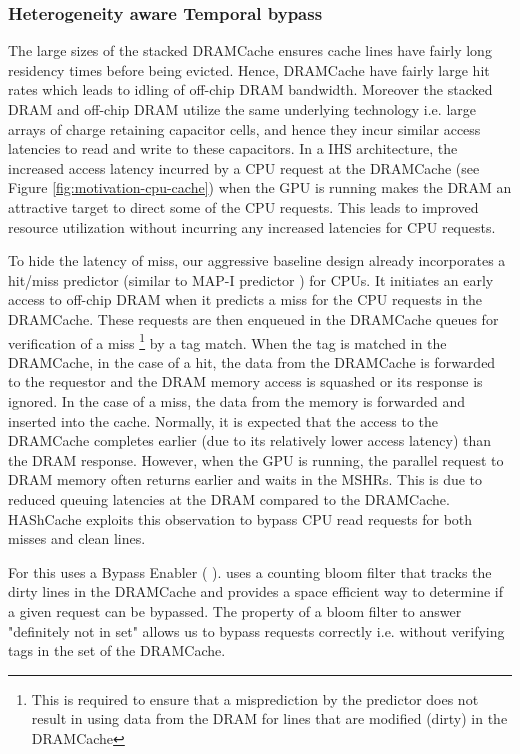 \subsubsection{Heterogeneity aware Temporal bypass}
The large sizes of the stacked DRAMCache ensures cache lines have fairly long residency times before being evicted. Hence, DRAMCache have fairly large hit rates which leads to idling of off-chip DRAM bandwidth. Moreover the stacked DRAM and off-chip DRAM utilize the same underlying technology i.e. large arrays of charge retaining capacitor cells, and hence they incur similar access latencies to read and write to these capacitors.
In a IHS architecture, the increased access latency incurred by a CPU request at the DRAMCache (see Figure \ref{fig:motivation-cpu-cache}) when the GPU is running makes the DRAM an attractive target to direct some of the CPU requests. This leads to improved resource utilization without incurring any increased latencies for CPU requests. 
\par To hide the latency of miss, our aggressive baseline design already incorporates a hit/miss predictor (similar to MAP-I predictor \cite{alloy}) for CPUs. It initiates an early access to off-chip DRAM when it predicts a miss for the CPU requests in the DRAMCache. These requests are then enqueued in the DRAMCache queues for verification of a miss 
\footnote{This is required to ensure that a misprediction by the predictor does not result in using data from the DRAM for lines that are modified (dirty) in the DRAMCache}
by a tag match. 
When the tag is matched in the DRAMCache, in the case of a hit, the data from the DRAMCache is forwarded to the requestor and the DRAM memory access is squashed or its response is ignored. In the case of a miss, the data from the memory is forwarded and inserted into the cache. Normally, it is expected that the access to the DRAMCache completes earlier (due to its relatively lower access latency) than the DRAM response. However, when the GPU is running, the parallel request to DRAM memory often returns earlier and waits in the MSHRs. This is due to reduced queuing latencies at the DRAM compared to the DRAMCache.  HAShCache exploits this observation to bypass CPU read requests for both misses and clean lines.
\par For this \cachename uses a Bypass Enabler ( \bypassname). \bypassname uses a counting bloom filter \cite{bloom,counting-bloom} that tracks the dirty lines in the DRAMCache and provides a space efficient way to determine if a given request can be bypassed. The property of a bloom filter to answer "definitely not in set" allows us to bypass requests correctly i.e. without verifying tags in the set of the DRAMCache. 
